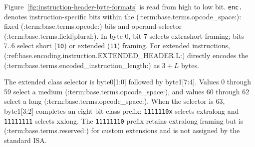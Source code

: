 Figure~\ref{fig:instruction-header-byte-formats} is read from high to low bit. \texttt{enc.} denotes
instruction-specific bits within the (:term:base.terms.opcode_space:): fixed (:term:base.terms.opcode:) bits and operand-selector (:term:base.terms.field|plural:). In byte 0, bit 7
selects extrashort framing; bits 7..6 select short (\texttt{10}) or extended (\texttt{11}) framing. For extended
instructions, (:ref:base.encoding.instruction.EXTENDED_HEADER.L:) directly encodes the (:term:base.terms.encoded_instruction_length:) as $3+L$ bytes.

The extended class selector is byte0[1:0] followed by byte1[7:4]. Values 0 through 59 select a medium
(:term:base.terms.opcode_space:), and values 60 through 62 select a long (:term:base.terms.opcode_space:). When the selector is 63,
byte1[3:2] completes an eight-bit class prefix: \texttt{1111110x} selects extralong and
\texttt{11111111} selects xxlong. The \texttt{11111110} prefix retains extralong framing but is
(:term:base.terms.reserved:) for custom extensions and is not assigned by the standard ISA.

